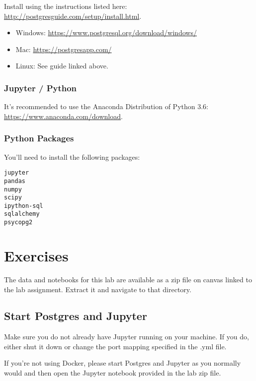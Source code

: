 \documentclass[paper=letter, fontsize=12pt]{article}
\numberwithin{equation}{section}
\numberwithin{figure}{section}
\numberwithin{table}{section}
\begin{document}
Install using the instructions listed here:
\href{http://postgresguide.com/setup/install.html}{http://postgresguide.com/setup/install.html}.

\begin{itemize}
  \item Windows:
    \href{https://www.postgresql.org/download/windows/}{https://www.postgresql.org/download/windows/}
  \item Mac: \href{https://postgresapp.com/}{https://postgresapp.com/}
  \item Linux: See guide linked above.
\end{itemize}

\subsubsection{Jupyter / Python}

It's recommended to use the Anaconda Distribution of Python 3.6:
\href{https://www.anaconda.com/download}{https://www.anaconda.com/download}.

\subsubsection{Python Packages}

You'll need to install the following packages:

\begin{verbatim}
jupyter
pandas
numpy
scipy
ipython-sql
sqlalchemy
psycopg2
\end{verbatim}

\section{Exercises}

The data and notebooks for this lab are available as a zip file on canvas
linked to the lab assignment.  Extract it and navigate to that directory.

\subsection{Start Postgres and Jupyter}


Make sure you do not already have Jupyter running on your machine. If you do, either shut it down or change the port mapping specified in the .yml file.

If you're not using Docker, please start Postgres and Jupyter as you normally
would and then open the Jupyter notebook provided in the lab zip file.
\end{document}
